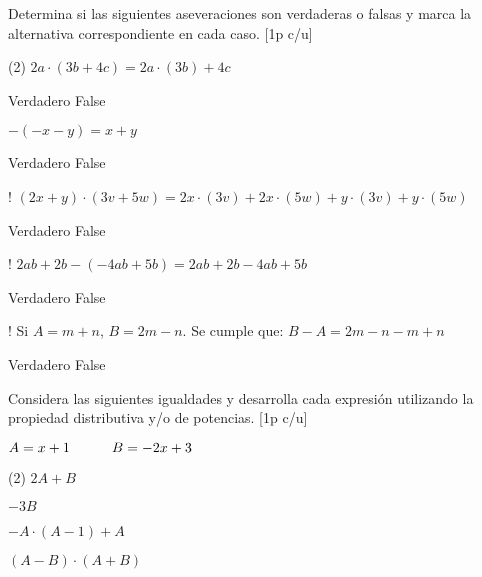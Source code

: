 \documentclass[sin curso]{plantilla-evaluacion-v1}
\begin{document}
\begin{partes}
  \parte Determina si las siguientes aseveraciones son verdaderas o falsas y marca 
  la alternativa correspondiente en cada caso. \hfill[1p c/u]
  \begin{ejercicios}(2)
    \ejercicio $2a\cdot(3b+4c)=2a\cdot(3b)+4c$
    \begin{vertical}
      \alternativa Verdadero
      \alternativa False
    \end{vertical}
    \ejercicio $-(-x-y)=x+y$
    \begin{vertical}
      \alternativa Verdadero
      \alternativa False
    \end{vertical}
    \ejercicio! $(2x+y)\cdot(3v+5w)=2x\cdot(3v)+2x\cdot(5w)+y\cdot(3v)+y\cdot(5w)$
    \begin{vertical}
      \alternativa Verdadero
      \alternativa False
    \end{vertical}
    \ejercicio! $2ab+2b-(-4ab+5b)=2ab+2b-4ab+5b$
    \begin{vertical}
      \alternativa Verdadero
      \alternativa False
    \end{vertical}
    \ejercicio! Si \hspace{2pt}$A=m+n$,\hspace{5pt} $B=2m-n$.\hspace{3pt} Se cumple que:\hspace{10pt} $B-A=2m-n-m+n$
    \begin{vertical}
      \alternativa Verdadero
      \alternativa False
    \end{vertical}
  \end{ejercicios}
\parte Considera las siguientes igualdades y desarrolla cada expresión utilizando 
la propiedad distributiva y/o de potencias. \hfill[1p c/u]
\begin{tcolorbox}[hbox,center,borderline={1pt}{0pt}{black, dashed},colframe=white,colback=white]
  $A = x+1 \hspace*{30pt} B=-2x+3$
\end{tcolorbox}
\begin{ejercicios}(2)
  \ejercicio $2A+B$
  \begin{malla}[height=2.5cm]
  \end{malla}
  \ejercicio $-3B$
  \begin{malla}[height=2.5cm]
  \end{malla}
  \ejercicio $-A\cdot(A-1)+A$
  \begin{malla}[height=3.5cm]
  \end{malla}
  \ejercicio $(A-B)\cdot(A+B)$

\end{ejercicios}
\end{partes}
\end{document}
